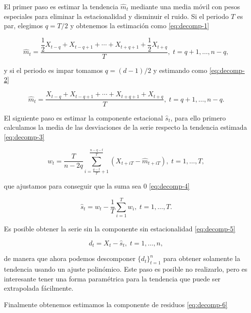 El primer paso es estimar la tendencia $\hat{m}_t$ mediante una media móvil con pesos especiales para eliminar la estacionalidad y disminuir el ruido. Si el periodo $T$ es par, elegimos $q = T / 2$ y obtenemos la estimación como \eqref{eq:decomp-1}

\begin{equation}
  \hat{m}_t = \dfrac{\dfrac{1}{2}X_{t - q} + X_{t-q+1} + \cdots + X_{t+q+1} + \dfrac{1}{2}X_{t + q}}{T}, \; t = q + 1, \ldots, n - q,
  \label{eq:decomp-1}
\end{equation}

y si el periodo es impar tomamos $q = (d-1)/2$ y estimando como \eqref{eq:decomp-2}

\begin{equation}
  \hat{m}_t = \dfrac{X_{t - q} + X_{t-q+1} + \cdots + X_{t+q+1} + X_{t + q}}{T}, \; t = q + 1, \ldots, n - q.
  \label{eq:decomp-2}
\end{equation}

El siguiente paso es estimar la componente estacional $\hat{s}_t$, para ello primero calculamos la media de las desviaciones de la serie respecto la tendencia estimada \eqref{eq:decomp-3}

\begin{equation}
  w_t = \dfrac{T}{n - 2q} \sum \limits^{\frac{n - q - t}{T}}_{i = \frac{q - t}{T} + 1} \left(X_{t + iT} - \hat{m}_{t + iT}\right), \; t = 1, \ldots, T,
  \label{eq:decomp-3}
\end{equation}

que ajustamos para conseguir que la suma sea 0 \eqref{eq:decomp-4}

\begin{equation}
  \hat{s}_t = w_t - \dfrac{1}{T}\sum \limits^T_{i = 1} w_i, \; t = 1, \ldots, T.
  \label{eq:decomp-4}
\end{equation}

Es posible obtener la serie sin la componente sin estacionalidad \eqref{eq:decomp-5}

\begin{equation}
  d_t = X_t - \hat{s}_t, \; t = 1, \ldots, n,
  \label{eq:decomp-5}
\end{equation}

de manera que ahora podemos descomponer $\{d_t\}_{t = 1}^n$ para obtener solamente la tendencia usando un ajuste polinómico. Este paso es posible no realizarlo, pero es interesante tener una forma paramétrica para la tendencia que puede ser extrapolada fácilmente.

Finalmente obtenemos estimamos la componente de residuos \eqref{eq:decomp-6}

